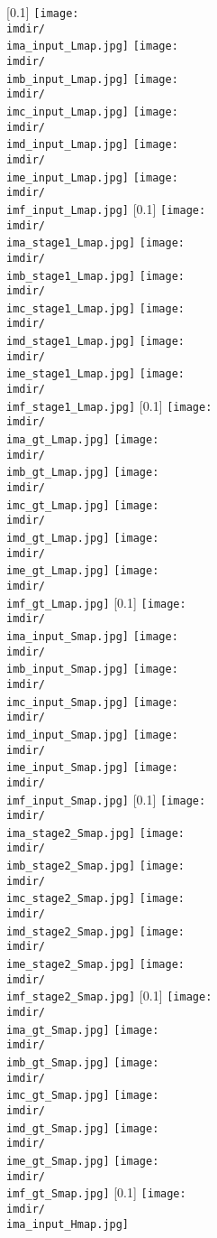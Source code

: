 \documentclass[runningheads]{llncs}
\begin{document}
\begin{figure*}[hthb]
[0.1\linewidth]
{
\texttt{[image: \\imdir/\\ima\_input\_Lmap.jpg]}
\texttt{[image: \\imdir/\\imb\_input\_Lmap.jpg]}
\texttt{[image: \\imdir/\\imc\_input\_Lmap.jpg]}
\texttt{[image: \\imdir/\\imd\_input\_Lmap.jpg]}
\texttt{[image: \\imdir/\\ime\_input\_Lmap.jpg]}
\texttt{[image: \\imdir/\\imf\_input\_Lmap.jpg]}
}
[0.1\linewidth]
{
\texttt{[image: \\imdir/\\ima\_stage1\_Lmap.jpg]}
\texttt{[image: \\imdir/\\imb\_stage1\_Lmap.jpg]}
\texttt{[image: \\imdir/\\imc\_stage1\_Lmap.jpg]}
\texttt{[image: \\imdir/\\imd\_stage1\_Lmap.jpg]}
\texttt{[image: \\imdir/\\ime\_stage1\_Lmap.jpg]}
\texttt{[image: \\imdir/\\imf\_stage1\_Lmap.jpg]}
}
[0.1\linewidth]
{
\texttt{[image: \\imdir/\\ima\_gt\_Lmap.jpg]}
\texttt{[image: \\imdir/\\imb\_gt\_Lmap.jpg]}
\texttt{[image: \\imdir/\\imc\_gt\_Lmap.jpg]}
\texttt{[image: \\imdir/\\imd\_gt\_Lmap.jpg]}
\texttt{[image: \\imdir/\\ime\_gt\_Lmap.jpg]}
\texttt{[image: \\imdir/\\imf\_gt\_Lmap.jpg]}
}
[0.1\linewidth]
{
\texttt{[image: \\imdir/\\ima\_input\_Smap.jpg]}
\texttt{[image: \\imdir/\\imb\_input\_Smap.jpg]}
\texttt{[image: \\imdir/\\imc\_input\_Smap.jpg]}
\texttt{[image: \\imdir/\\imd\_input\_Smap.jpg]}
\texttt{[image: \\imdir/\\ime\_input\_Smap.jpg]}
\texttt{[image: \\imdir/\\imf\_input\_Smap.jpg]}
}
[0.1\linewidth]
{
\texttt{[image: \\imdir/\\ima\_stage2\_Smap.jpg]}
\texttt{[image: \\imdir/\\imb\_stage2\_Smap.jpg]}
\texttt{[image: \\imdir/\\imc\_stage2\_Smap.jpg]}
\texttt{[image: \\imdir/\\imd\_stage2\_Smap.jpg]}
\texttt{[image: \\imdir/\\ime\_stage2\_Smap.jpg]}
\texttt{[image: \\imdir/\\imf\_stage2\_Smap.jpg]}
}
[0.1\linewidth]
{
\texttt{[image: \\imdir/\\ima\_gt\_Smap.jpg]}
\texttt{[image: \\imdir/\\imb\_gt\_Smap.jpg]}
\texttt{[image: \\imdir/\\imc\_gt\_Smap.jpg]}
\texttt{[image: \\imdir/\\imd\_gt\_Smap.jpg]}
\texttt{[image: \\imdir/\\ime\_gt\_Smap.jpg]}
\texttt{[image: \\imdir/\\imf\_gt\_Smap.jpg]}
}
[0.1\linewidth]
{
\texttt{[image: \\imdir/\\ima\_input\_Hmap.jpg]}
}
\end{figure*}
\end{document}
